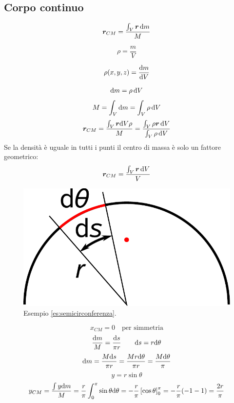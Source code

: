 \subsection{Corpo continuo}
\begin{Def}
  \begin{equation}\boldsymbol{r}_{CM}=\frac{\int_V \boldsymbol{r}\,\mathrm{d} m}{M}\end{equation}
\end{Def}
\begin{Def}
  \begin{equation}\rho =\frac{m}{V}\end{equation}
\end{Def}
\begin{Def}
  \begin{equation}\rho(x,y,z)=\frac{\mathrm{d} m}{\mathrm{d} V}\end{equation}
\end{Def}
\[\mathrm{d} m=\rho\,\mathrm{d} V\]
\[M=\int_V \mathrm{d} m=\int_V\rho \,\mathrm{d} V\]
\begin{equation}\boldsymbol{r}_{CM}=\frac{\int_V \boldsymbol{r} \mathrm{d} V\rho}{M}=\frac{\int_V\rho\boldsymbol{r}\,\mathrm{d} V}{\int_V \rho \,\mathrm{d} V}\end{equation}
Se la densità è uguale in tutti i punti il centro di massa è solo un fattore geometrico:
\[\boldsymbol{r}_{CM}=\frac{\int_V\boldsymbol{r}\,\mathrm{d} V}{V}\]

\begin{Es}[semicirconferenza]
  \label{es:semicirconferenza}
  \begin{figure}[htp]
    \centering
    \includegraphics[scale=0.4]{immagini/fisica1/semicerchio}
    \caption{Esempio \ref{es:semicirconferenza}.}
  \end{figure}

  \[x_{CM}=0 \quad\text{per simmetria}\]
  \[\frac{\mathrm{d} m}{M}=\frac{\mathrm{d} s}{\pi r}\qquad \mathrm{d} s=r\mathrm{d}\theta\]
  \[\mathrm{d} m=\frac{M\mathrm{d} s}{\pi r}=\frac{Mr\mathrm{d}\theta}{\pi r}=\frac{M\mathrm{d}\theta}{\pi}\]
  \[y=r \sin \theta\]
  \[y_{CM}=\frac{\int y\mathrm{d} m}{M}=\frac{r}{\pi}\int_0^\pi \sin\theta \mathrm{d} \theta=-\frac{r}{\pi}\left[\cos\theta\right]_0^\pi=-\frac{r}{\pi}(-1-1)=\frac{2r}{\pi}\]
\end{Es}

